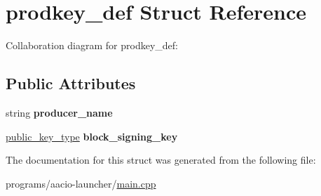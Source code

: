 \hypertarget{structprodkey__def}{}\section{prodkey\+\_\+def Struct Reference}
\label{structprodkey__def}


Collaboration diagram for prodkey\+\_\+def\+:
\subsection*{Public Attributes}
\begin{DoxyCompactItemize}
\item 
\mbox{\label{structprodkey__def_aaa385f5948ac3309918ea6f478b8a62c}} 
string {\bfseries producer\+\_\+name}
\item 
\mbox{\label{structprodkey__def_a6ae33570d52a4df4e095402c2eea00af}} 
\mbox{\hyperlink{classfc_1_1crypto_1_1public__key}{public\+\_\+key\+\_\+type}} {\bfseries block\+\_\+signing\+\_\+key}
\end{DoxyCompactItemize}


The documentation for this struct was generated from the following file\+:\begin{DoxyCompactItemize}
\item 
programs/aacio-\/launcher/\mbox{\hyperlink{programs_2aacio-launcher_2main_8cpp}{main.\+cpp}}\end{DoxyCompactItemize}
